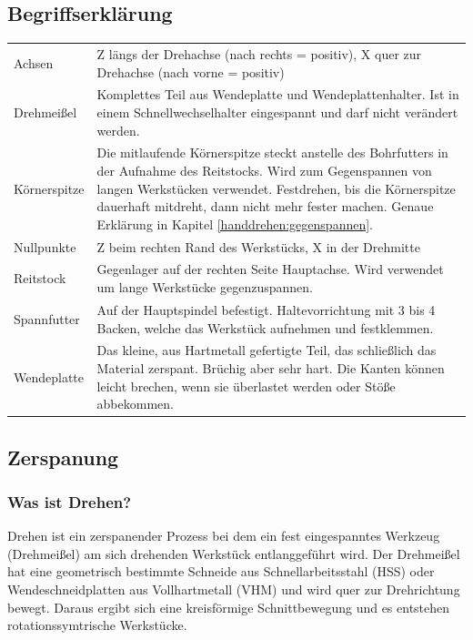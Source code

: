 \documentclass{\basedir/fablab-document}
\begin{document}
\subsection{Begriffserklärung}
\begin{tabular}{p{} p{}}
Achsen 				& Z längs der Drehachse (nach rechts = positiv), X quer zur Drehachse (nach vorne = positiv) \\
Drehmeißel 		& Komplettes Teil aus Wendeplatte und Wendeplattenhalter. Ist in einem Schnellwechselhalter eingespannt und darf nicht verändert werden. \\
Körnerspitze 	& Die mitlaufende Körnerspitze steckt anstelle des Bohrfutters in der Aufnahme des Reitstocks. Wird zum Gegenspannen von langen Werkstücken verwendet. Festdrehen, bis die Körnerspitze dauerhaft mitdreht, dann nicht mehr fester machen. Genaue Erklärung in Kapitel \ref{handdrehen:gegenspannen}. \\
Nullpunkte 		& Z beim rechten Rand des Werkstücks, X in der Drehmitte \\
Reitstock 		& Gegenlager auf der rechten Seite Hauptachse. Wird verwendet um lange Werkstücke gegenzuspannen. \\
Spannfutter 	& Auf der Hauptspindel befestigt. Haltevorrichtung mit 3 bis 4 Backen, welche das Werkstück aufnehmen und festklemmen. \\
Wendeplatte 	& Das kleine, aus Hartmetall gefertigte Teil, das schließlich das Material zerspant. Brüchig aber sehr hart. Die Kanten können leicht brechen, wenn sie überlastet werden oder Stöße abbekommen. \\
\end{tabular}

\subsection{Zerspanung}
\subsubsection{Was ist Drehen?}
Drehen ist ein zerspanender Prozess bei dem ein fest eingespanntes Werkzeug (Drehmeißel) am sich drehenden Werkstück entlanggeführt wird.
Der Drehmeißel hat eine geometrisch bestimmte Schneide aus Schnellarbeitsstahl (HSS) oder Wendeschneidplatten aus Vollhartmetall (VHM) und wird quer zur Drehrichtung bewegt.
Daraus ergibt sich eine kreisförmige Schnittbewegung und es entstehen rotationssymtrische Werkstücke.
\end{document}
